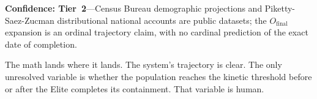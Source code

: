 \noindent\textbf{Confidence: Tier~2}---Census Bureau demographic projections and Piketty-Saez-Zucman distributional national accounts are public datasets; the $O_{\text{final}}$ expansion is an ordinal trajectory claim, with no cardinal prediction of the exact date of completion.

The math lands where it lands. The system's trajectory is clear. The only unresolved variable is whether the population reaches the kinetic threshold before or after the Elite completes its containment. That variable is human.

\appendix
